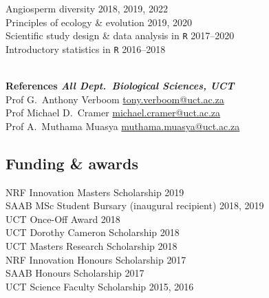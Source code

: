 \documentclass[10pt]{article}
\begin{document}
\begin{multicols}{2}
Angiosperm diversity                         \hfill {\small 2018, 2019, 2022} \\
Principles of ecology \& evolution           \hfill {\small       2019, 2020} \\
Scientific study design \& data analysis in
  \texttt{R}                                 \hfill {\small       2017--2020} \\
Introductory statistics in \texttt{R}        \hfill {\small       2016--2018} \\

\

\textbf{References %
        \hfill {\small \textmd{\textit{All Dept.~Biological Sciences, UCT}}}} \\

Prof G.~Anthony Verboom
      \hfill     \href{mailto:tony.verboom@uct.ac.za}{tony.verboom@uct.ac.za} \\
Prof Michael D.~Cramer
      \hfill \href{mailto:michael.cramer@uct.ac.za}{michael.cramer@uct.ac.za} \\
Prof A.~Muthama Muasya
      \hfill \href{mailto:muthama.muasya@uct.ac.za}{muthama.muasya@uct.ac.za} \\

\subsection*{Funding \& awards} %

NRF Innovation Masters Scholarship                 \hfill {\small       2019} \\
SAAB MSc Student Bursary
  {\small (inaugural recipient)}                   \hfill {\small 2018, 2019} \\
UCT Once-Off Award                                 \hfill {\small       2018} \\
UCT Dorothy Cameron Scholarship                    \hfill {\small       2018} \\
UCT Masters Research Scholarship                   \hfill {\small       2018} \\
NRF Innovation Honours Scholarship                 \hfill {\small       2017} \\
SAAB Honours Scholarship                           \hfill {\small       2017} \\
UCT Science Faculty Scholarship                    \hfill {\small 2015, 2016} \\


\end{multicols}
\end{document}
